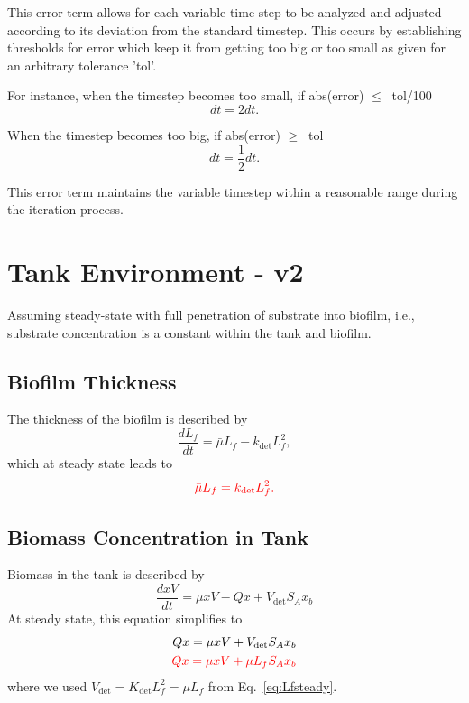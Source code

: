 \documentclass[letterpaper, twoside]{article}
\numberwithin{equation}{section}
\newcommand{\ie}{i.e.}
\begin{document}
This error term allows for each variable time step to be analyzed and adjusted according to its deviation from the standard timestep. This occurs by establishing thresholds for error which keep it from getting too big or too small as given for an arbitrary tolerance 'tol'.

For instance, when the timestep becomes too small,  if abs(error) $ \leq\ $ tol/100
\begin{equation}
  dt = 2 dt.
\end{equation}

When the timestep becomes too big, if abs(error) $ \geq\ $ tol
\begin{equation}
  dt = \frac{1}{2} dt.
\end{equation}

This error term maintains the variable timestep within a reasonable range during the iteration process.


\section{Tank Environment - v2}
Assuming steady-state with full penetration of substrate into biofilm, \ie, substrate concentration is a constant within the tank and biofilm.
\subsection{Biofilm Thickness}
The thickness of the biofilm is described by
\begin{equation}
  \frac{d L_f}{dt} = {\bar\mu L_f}-{k_{\mathrm{det}}L_f^2},
\end{equation}
which at steady state leads to
\begin{equation}\label{eq:Lfsteady}
{\color{red}
  {\bar\mu L_f}={k_{\mathrm{det}}L_f^2}.
}
\end{equation}

\subsection{Biomass Concentration in Tank}
Biomass in the tank is described by
\begin{equation}
  \frac{dx V}{dt} = \mu xV - Q x +V_{\mathrm{det}} S_A x_b
\end{equation}
At steady state, this equation simplifies to
\begin{align} 
  Qx = \mu xV +V_{\mathrm{det}} S_A x_b\\
   {\color{red}
  Qx = \mu xV +\mu L_f S_A x_b
  }
\end{align}
where we used $V_{\mathrm{det}}= K_\mathrm{det} L_f^2 = \mu L_f$ from Eq.~\ref{eq:Lfsteady}.
\end{document}
